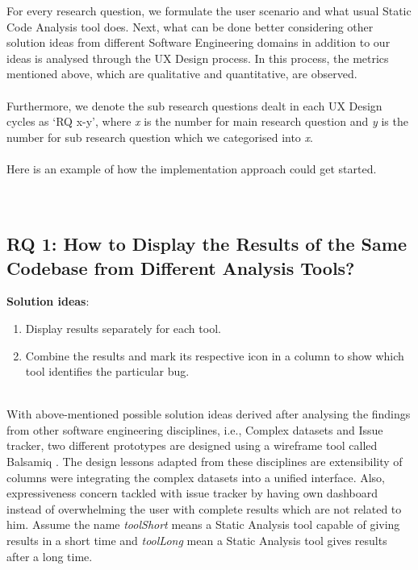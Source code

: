 For every research question, we formulate the user scenario and what usual Static Code Analysis tool does. Next, what can be done better considering other solution ideas from different Software Engineering domains in addition to our ideas is analysed through the UX Design process. In this process, the metrics mentioned above, which are qualitative and quantitative, are observed. \\ \\

Furthermore, we denote the sub research questions dealt in each UX Design cycles as ‘RQ x-y’, where \textit{x} is the number for main research question and \textit{y} is the number for sub research question which we categorised into \textit{x}. \\ \\

Here is an example of how the implementation approach could get started. \\ \\ \\

\subsection{RQ 1: How to Display the Results of the Same Codebase from Different Analysis Tools?} 

\hfill \break
\textbf{Solution ideas}: \\ 
\begin{enumerate}
\item  Display results separately for each tool.
\item  Combine the results and mark its respective icon in a column to show which tool identifies the particular bug. \\ \\
\end{enumerate}

With above-mentioned possible solution ideas derived after analysing the findings from other software engineering disciplines, i.e., Complex datasets and Issue tracker, two different prototypes are designed using a wireframe tool called Balsamiq \cite{B}. The design lessons adapted from these disciplines are extensibility of columns were integrating the complex datasets into a unified interface. Also, expressiveness concern tackled with issue tracker by having own dashboard instead of overwhelming the user with complete results which are not related to him. Assume the name \textit{toolShort} means a Static Analysis tool capable of giving results in a short time and \textit{toolLong} mean a Static Analysis tool gives results after a long time. \\ \\ 

